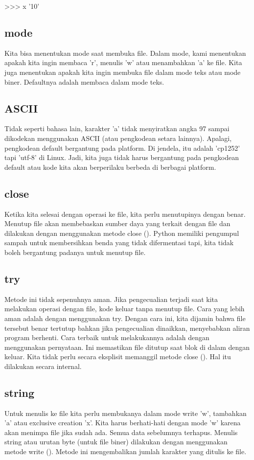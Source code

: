 >>> x
'10'

\subsection{mode}
Kita bisa menentukan mode saat membuka file. Dalam mode, kami menentukan apakah kita ingin membaca 'r', menulis 'w' atau menambahkan 'a' ke file. Kita juga menentukan apakah kita ingin membuka file dalam mode teks atau mode biner. Defaultnya adalah membaca dalam mode teks. 

\subsection{ASCII}
Tidak seperti bahasa lain, karakter 'a' tidak menyiratkan angka 97 sampai dikodekan menggunakan ASCII (atau pengkodean setara lainnya). Apalagi, pengkodean default bergantung pada platform. Di jendela, itu adalah 'cp1252' tapi 'utf-8' di Linux. Jadi, kita juga tidak harus bergantung pada pengkodean default atau kode kita akan berperilaku berbeda di berbagai platform.

\subsection{close}
Ketika kita selesai dengan operasi ke file, kita perlu menutupinya dengan benar. Menutup file akan membebaskan sumber daya yang terkait dengan file dan dilakukan dengan menggunakan metode close (). Python memiliki pengumpul sampah untuk membersihkan benda yang tidak difermentasi tapi, kita tidak boleh bergantung padanya untuk menutup file.

\subsection{try}
Metode ini tidak sepenuhnya aman. Jika pengecualian terjadi saat kita melakukan operasi dengan file, kode keluar tanpa menutup file. Cara yang lebih aman adalah dengan menggunakan try. Dengan cara ini, kita dijamin bahwa file tersebut benar tertutup bahkan jika pengecualian dinaikkan, menyebabkan aliran program berhenti. Cara terbaik untuk melakukannya adalah dengan menggunakan pernyataan. Ini memastikan file ditutup saat blok di dalam dengan keluar. Kita tidak perlu secara eksplisit memanggil metode close (). Hal itu dilakukan secara internal.

\subsection{string}
Untuk menulis ke file kita perlu membukanya dalam mode write 'w', tambahkan 'a' atau exclusive creation 'x'. Kita harus berhati-hati dengan mode 'w' karena akan menimpa file jika sudah ada. Semua data sebelumnya terhapus. Menulis string atau urutan byte (untuk file biner) dilakukan dengan menggunakan metode write (). Metode ini mengembalikan jumlah karakter yang ditulis ke file. 

